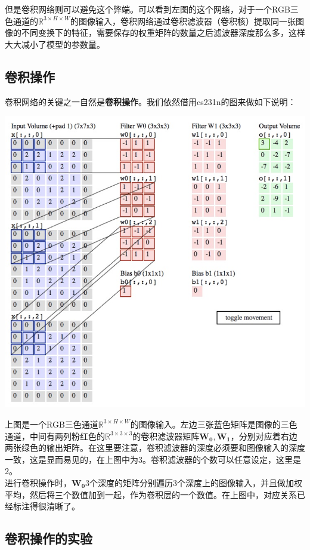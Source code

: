 \documentclass[12pt]{article}
\begin{document}
但是卷积网络则可以避免这个弊端。可以看到左图的这个网络，对于一个RGB三色通道的$\mathbb{R}^{3 \times H \times W}$的图像输入，卷积网络通过卷积滤波器（卷积核）提取同一张图像的不同变换下的特征，需要保存的权重矩阵的数量之后滤波器深度那么多，这样大大减小了模型的参数量。

\subsection{卷积操作}

卷积网络的关键之一自然是\textbf{卷积操作}。我们依然借用cs231n的图来做如下说明：

\begin{center}
\includegraphics[width=0.8\linewidth]{fig11.jpg}
\end{center}

上图是一个RGB三色通道$\mathbb{R}^{3 \times H \times W}$的图像输入。左边三张蓝色矩阵是图像的三色通道，中间有两列粉红色的$\mathbb{R}^{3 \times 3 \times 3}$的卷积滤波器矩阵$\mathbf{W_0}, \mathbf{W_1}$，分别对应着右边两张绿色的输出矩阵。在这里要注意，卷积滤波器的深度必须要和图像输入的深度一致，这是显而易见的，在上图中为3。卷积滤波器的个数可以任意设定，这里是2。\\

进行卷积操作时，$\mathbf{W_0}$3个深度的矩阵分别遍历3个深度上的图像输入，并且做加权平均，然后将三个数值加到一起，作为卷积层的一个数值。在上图中，对应关系已经标注得很清晰了。\\

\subsection{卷积操作的实验}
\end{document}
